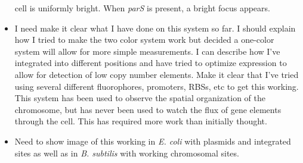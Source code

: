 \begin{itemize}
		cell is uniformly bright. When \textit{parS} is present, a
		bright focus appears. 
	\item I need make it clear what I have done on this system so far. I
		should explain how I tried to make the two color system work but
		decided a one-color system will allow for more simple
		measurements. I can describe how I've integrated into different
		positions and have tried to optimize expression to allow for
		detection of low copy number elements. Make it clear that I've
		tried using several different fluorophores, promoters, RBSs, etc
		to get this working. This system has been used to observe the
		spatial organization of the chromosome, but has never been
		used to watch the flux of gene elements through the cell. This
		has required more work than initially thought. 
	\item  Need to show image of this working in \textit{E. coli} with
		plasmids and integrated sites as well as in \textit{B. subtilis}
		with working chromosomal sites. 
\end{itemize}
